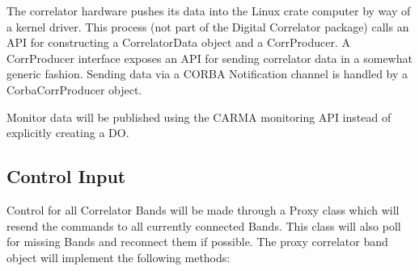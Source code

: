 \documentclass[11pt]{article}
\begin{document}
The correlator hardware pushes its data into the Linux crate computer by way
of a kernel driver. This process (not part of the Digital Correlator package)
calls an API for constructing a CorrelatorData object and a CorrProducer.
A CorrProducer interface exposes an API for sending correlator data in a
somewhat generic fashion. Sending data via a CORBA Notification channel is
handled by a CorbaCorrProducer object.

Monitor data will be published using the CARMA monitoring API instead of
explicitly creating a DO.

\subsection{Control Input}
Control for all Correlator Bands will be made through a Proxy class
which will resend the commands to all currently connected Bands. This
class will also poll for missing Bands and reconnect them if possible.
The proxy correlator band object will implement the following methods:
\end{document}
